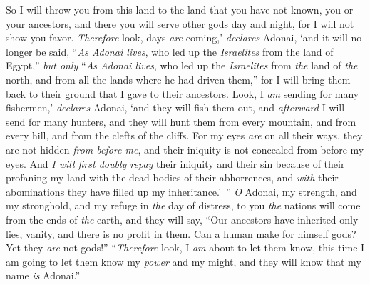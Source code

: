 \begin{biblechapter}
\verse So I will throw you from this land to the land that you have not known, you or your ancestors, and there you will serve other gods day and night, for I will not show you favor.
 \textit{Therefore} look, days \textit{are} coming,’ \textit{declares} Adonai, ‘and it will no longer be said, “\textit{As Adonai lives}, who led up the \textit{Israelites} from the land of Egypt,”
\verse \textit{but only} “\textit{As Adonai lives}, who led up the \textit{Israelites} from \textit{the} land of \textit{the} north, and from all the lands where he had driven them,” for I will bring them back to their ground that I gave to their ancestors.
\verse Look, I \textit{am} sending for many fishermen,’ \textit{declares} Adonai, ‘and they will fish them out, and \textit{afterward} I will send for many hunters, and they will hunt them from every mountain, and from every hill, and from the clefts of the cliffs.
\verse For my eyes \textit{are} on all their ways, they are not hidden \textit{from before me}, and their iniquity is not concealed from before my eyes.
\verse And \textit{I will first doubly repay} their iniquity and their sin because of their profaning my land with the dead bodies of their abhorrences, and \textit{with} their abominations they have filled up my inheritance.’ ”
\verse \textit{O} Adonai, my strength, and my stronghold, 
and my refuge in \textit{the} day of distress, 
to you \textit{the} nations will come from the ends of \textit{the} earth, 
and they will say, “Our ancestors have inherited only lies, 
vanity, and there is no profit in them.
\verse Can a human make for himself gods? 
Yet they \textit{are} not gods!”
\verse “\textit{Therefore} look, I \textit{am} about to let them know, 
this time I am going to let them know 
my \textit{power} and my might, 
and they will know that my name \textit{is} Adonai.”
\end{biblechapter}

